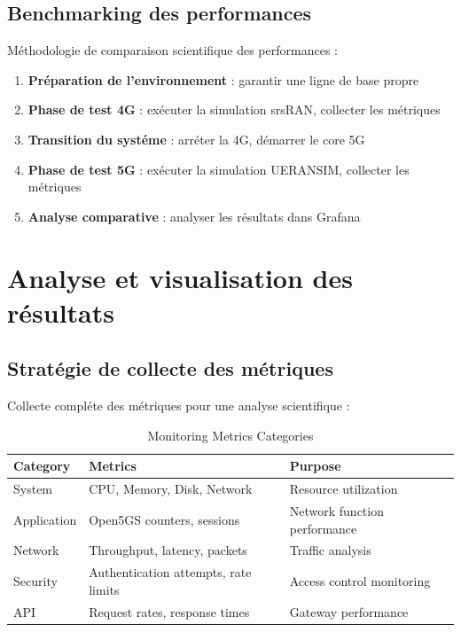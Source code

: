 \documentclass[12pt,a4paper]{report}
\begin{document}
\subsection{Benchmarking des performances}

Méthodologie de comparaison scientifique des performances :

\begin{enumerate}
    \item \textbf{Préparation de l'environnement} : garantir une ligne de base propre
    \item \textbf{Phase de test 4G} : exécuter la simulation srsRAN, collecter les métriques
    \item \textbf{Transition du systéme} : arréter la 4G, démarrer le core 5G
    \item \textbf{Phase de test 5G} : exécuter la simulation UERANSIM, collecter les métriques
    \item \textbf{Analyse comparative} : analyser les résultats dans Grafana
\end{enumerate}

\section{Analyse et visualisation des résultats}

\subsection{Stratégie de collecte des métriques}

Collecte compléte des métriques pour une analyse scientifique :

\begin{table}[H]
\centering
\caption{Monitoring Metrics Categories}
\label{tab:monitoring-metrics}
\begin{tabular}{@{}lll@{}}
\toprule
Category & Metrics & Purpose \\
\midrule
System & CPU, Memory, Disk, Network & Resource utilization \\
Application & Open5GS counters, sessions & Network function performance \\
Network & Throughput, latency, packets & Traffic analysis \\
Security & Authentication attempts, rate limits & Access control monitoring \\
API & Request rates, response times & Gateway performance \\
\bottomrule
\end{tabular}
\end{table}
\end{document}

